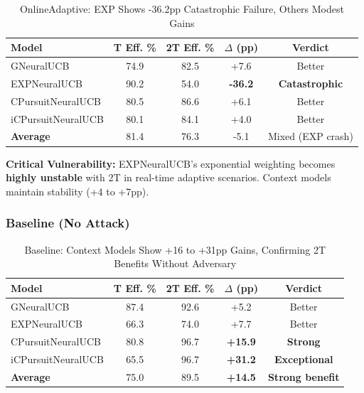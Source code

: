 \documentclass[11pt,a4paper]{article}
\newcommand{\critical}[1]{\textcolor{criticalcolor}{\textbf{#1}}}
\newcommand{\success}[1]{\textcolor{successcolor}{\textbf{#1}}}
\begin{document}
\begin{table}[H]
\scriptsize
\centering
\begin{tabular}{lcccc}
\toprule
\textbf{Model} & \textbf{T Eff. \%} & \textbf{2T Eff. \%} & \textbf{$\Delta$ (pp)} & \textbf{Verdict} \\
\midrule
GNeuralUCB & 74.9 & 82.5 & +7.6 & Better \\
EXPNeuralUCB & 90.2 & 54.0 & \critical{-36.2} & \critical{Catastrophic} \\
CPursuitNeuralUCB & 80.5 & 86.6 & +6.1 & Better \\
iCPursuitNeuralUCB & 80.1 & 84.1 & +4.0 & Better \\
\midrule
\textbf{Average} & 81.4 & 76.3 & -5.1 & Mixed (EXP crash) \\
\bottomrule
\end{tabular}
\vspace{-0.2cm}
\caption{OnlineAdaptive: EXP Shows -36.2pp Catastrophic Failure, Others Modest Gains}
\end{table}

\vspace{-0.2cm}

\textbf{Critical Vulnerability:} EXPNeuralUCB's exponential weighting becomes \critical{highly unstable} with 2T in real-time adaptive scenarios. Context models maintain stability (+4 to +7pp).

\subsubsection{Baseline (No Attack)}

\vspace{-0.4cm}

\begin{table}[H]
\scriptsize
\centering
\begin{tabular}{lcccc}
\toprule
\textbf{Model} & \textbf{T Eff. \%} & \textbf{2T Eff. \%} & \textbf{$\Delta$ (pp)} & \textbf{Verdict} \\
\midrule
GNeuralUCB & 87.4 & 92.6 & +5.2 & Better \\
EXPNeuralUCB & 66.3 & 74.0 & +7.7 & Better \\
CPursuitNeuralUCB & 80.8 & 96.7 & \success{+15.9} & \success{Strong} \\
iCPursuitNeuralUCB & 65.5 & 96.7 & \success{+31.2} & \success{Exceptional} \\
\midrule
\textbf{Average} & 75.0 & 89.5 & \success{+14.5} & \success{Strong benefit} \\
\bottomrule
\end{tabular}
\vspace{-0.2cm}
\caption{Baseline: Context Models Show +16 to +31pp Gains, Confirming 2T Benefits Without Adversary}
\end{table}
\end{document}
